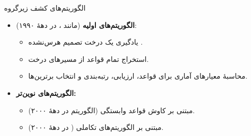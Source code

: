 \begin{frame}{الگوریتم‌های کشف زیرگروه}{}
\begin{itemize}\setlength{\itemsep}{6pt}
    \item \textbf{الگوریتم‌های اولیه} (مانند ،  در دههٔ ۱۹۹۰):
    \begin{itemize}\setlength{\itemsep}{3pt}
        \item یادگیری یک درخت تصمیم هرس‌نشده .
        \item استخراج تمام قواعد از مسیرهای درخت.
        \item محاسبهٔ معیارهای آماری برای قواعد، ارزیابی، رتبه‌بندی و انتخاب برترین‌ها.
    \end{itemize}
    \vspace{0.2cm}
    \item \textbf{الگوریتم‌های نوین‌تر:}
    \begin{itemize}\setlength{\itemsep}{3pt}
        \item مبتنی بر کاوش قواعد وابستگی (الگوریتم  در دههٔ ۲۰۰۰).
        \item مبتنی بر الگوریتم‌های تکاملی ( در دههٔ ۲۰۰۰).
    \end{itemize}
\end{itemize}
\end{frame}

